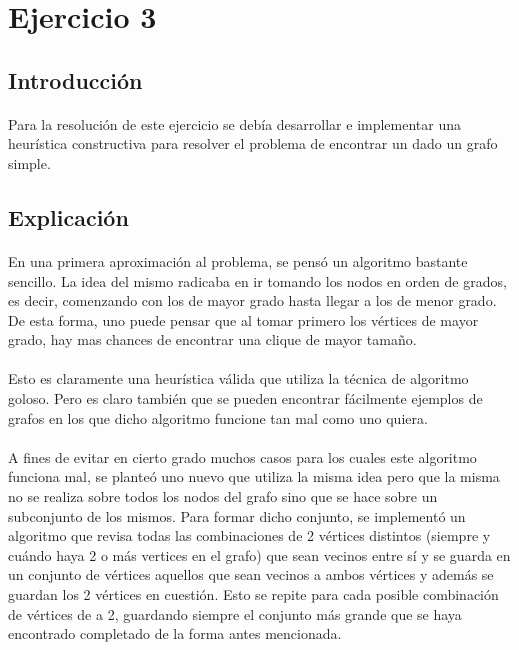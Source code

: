 \section{Ejercicio 3}
\label{ej3}
\subsection{Introducción}

\paragraph{}
Para la resolución de este ejercicio se debía desarrollar e implementar una heurística constructiva  para resolver el problema de encontrar un \mc dado un grafo simple.


\subsection{Explicación}

\paragraph{}
En una primera aproximación al problema, se pensó un algoritmo bastante sencillo. La idea del mismo radicaba en ir tomando los nodos en orden de grados, es decir, comenzando con los de mayor grado hasta llegar a los de menor grado. De esta forma, uno puede pensar que al tomar primero los vértices de mayor grado, hay mas chances de encontrar una clique de mayor tamaño.

\paragraph{}
Esto es claramente una heurística válida que utiliza la técnica de algoritmo goloso. Pero es claro también que se pueden encontrar fácilmente ejemplos de grafos en los que dicho algoritmo funcione tan mal como uno quiera.

\paragraph{}
A fines de evitar en cierto grado muchos casos para los cuales este algoritmo funciona mal, se planteó uno nuevo que utiliza la misma idea pero que la misma no se realiza sobre todos los nodos del grafo sino que se hace sobre un subconjunto de los mismos. Para formar dicho conjunto, se implementó un algoritmo que revisa todas las combinaciones de 2 vértices distintos (siempre y cuándo haya 2 o más vertices en el grafo) que sean vecinos entre sí y se guarda en un conjunto de vértices aquellos que sean vecinos a ambos vértices y además se guardan los 2 vértices en cuestión. Esto se repite para cada posible combinación de vértices de a 2, guardando siempre el conjunto más grande que se haya encontrado completado de la forma antes mencionada.

